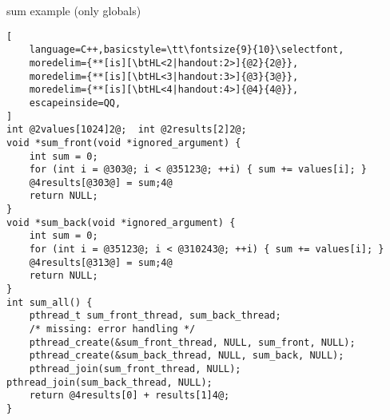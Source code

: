 \begin{frame}[fragile,label=sumToGlobal]{sum example (only globals)}
\begin{lstlisting}[
    language=C++,basicstyle=\tt\fontsize{9}{10}\selectfont,
    moredelim={**[is][\btHL<2|handout:2>]{@2}{2@}},
    moredelim={**[is][\btHL<3|handout:3>]{@3}{3@}},
    moredelim={**[is][\btHL<4|handout:4>]{@4}{4@}},
    escapeinside=QQ,
]
int @2values[1024]2@;  int @2results[2]2@;
void *sum_front(void *ignored_argument) {
    int sum = 0;
    for (int i = @303@; i < @35123@; ++i) { sum += values[i]; }
    @4results[@303@] = sum;4@
    return NULL;
}
void *sum_back(void *ignored_argument) {
    int sum = 0;
    for (int i = @35123@; i < @310243@; ++i) { sum += values[i]; }
    @4results[@313@] = sum;4@
    return NULL;
}
int sum_all() {
    pthread_t sum_front_thread, sum_back_thread;
    /* missing: error handling */
    pthread_create(&sum_front_thread, NULL, sum_front, NULL);
    pthread_create(&sum_back_thread, NULL, sum_back, NULL);
    pthread_join(sum_front_thread, NULL); pthread_join(sum_back_thread, NULL);
    return @4results[0] + results[1]4@;
}
\end{lstlisting}
\end{frame}

